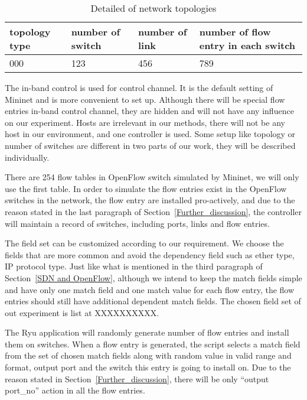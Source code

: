 \begin{table}[H]
\centering
\caption{Detailed of network topologies}
\begin{tabular}{|l|p{4cm}|p{4.5cm}|p{4.5cm}|}
\hline  topology type & number of switch & number of link & number of flow entry in each switch \\
\hline 000 & 123 & 456 & 789	\\
\hline 
\end{tabular}
\label{table:network_env}
\end{table}


The in-band control is used for control channel. It is the default setting of Mininet and is more convenient to set up. Although there will be special flow entries in-band control channel, they are hidden and will not have any influence on our experiment. Hosts are irrelevant in our methods, there will not be any host in our environment, and one controller is used. Some setup like topology or number of switches are different in two parts of our work, they will be described individually.

There are 254 flow tables in OpenFlow switch simulated by Mininet, we will only use the first table. In order to simulate the flow entries exist in the OpenFlow switches in the network, the flow entry are installed pro-actively, and due to the reason stated in the last paragraph of Section~\ref{Further_discussion}, the controller will maintain a record of switches, including ports, links and flow entries. 

The field set can be customized according to our requirement. We choose the fields that are more common and avoid the dependency field such as ether type, IP protocol type. Just like what is mentioned in the third paragraph of Section~\ref{SDN and OpenFlow}, although we intend to keep the match fields simple and have only one match field and one match value for each flow entry, the flow entries should still have additional dependent match fields. The chosen field set of out experiment is list at XXXXXXXXXX.



The Ryu application will randomly generate number of flow entries and install them on switches. 
When a flow entry is generated, the script selects a match field from the set of chosen match fields along with random value in valid range and format, output port and the switch this entry is going to install on. Due to the reason stated in Section~\ref{Further_discussion}, there will be only ``output port\_no'' action in all the flow entries.

